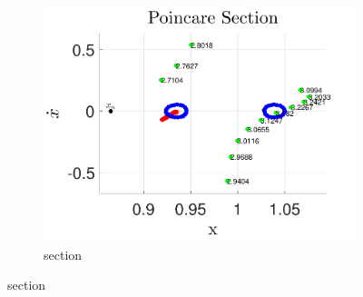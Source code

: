 \documentclass[smallcondensed]{svjour3}
\begin{document}
\begin{figure}
\begin{subfigure}[htbp]{0.5\textwidth}
                \includegraphics[width=\textwidth]{poincare_compare} 
                \caption{\Poincare section} \label{fig:poincare_compare} 
        \end{subfigure} %
                

\end{figure}
\end{document}
